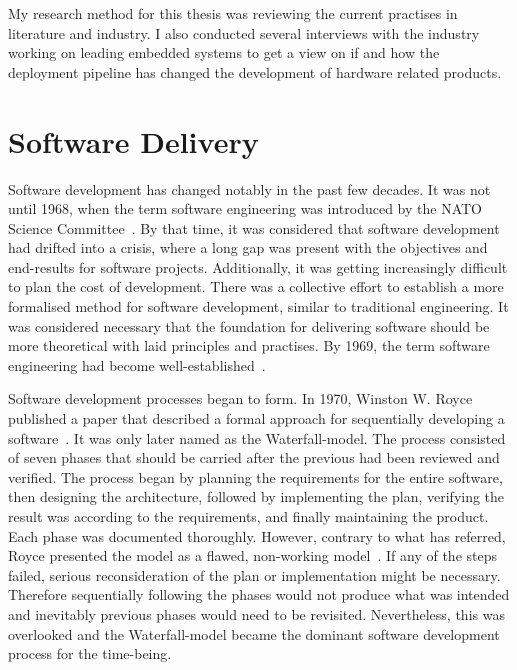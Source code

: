 \documentclass[english]{tktltiki2}
\begin{document}
My research method for this thesis was reviewing the current practises in literature and industry. I also conducted several interviews with the industry working on leading embedded systems to get a view on if and how the deployment pipeline has changed the development of hardware related products.


\section{Software Delivery}

Software development has changed notably in the past few decades. It was not until 1968, when the term software engineering was introduced by the NATO Science Committee~\cite{NR69}. By that time, it was considered that software development had drifted into a crisis, where a long gap was present with the objectives and end-results for software projects. Additionally, it was getting increasingly difficult to plan the cost of development. There was a collective effort to establish a more formalised method for software development, similar to traditional engineering. It was considered necessary that the foundation for delivering software should be more theoretical with laid principles and practises. By 1969, the term software engineering had become well-established~\cite{BR70}.

Software development processes began to form. In 1970, Winston W. Royce published a paper that described a formal approach for sequentially developing a software~\cite{Roy70}. It was only later named as the Waterfall-model. The process consisted of seven phases that should be carried after the previous had been reviewed and verified. The process began by planning the requirements for the entire software, then designing the architecture, followed by implementing the plan, verifying the result was according to the requirements, and finally maintaining the product. Each phase was documented thoroughly. However, contrary to what has referred, Royce presented the model as a flawed, non-working model~\cite{Roy70}. If any of the steps failed, serious reconsideration of the plan or implementation might be necessary. Therefore sequentially following the phases would not produce what was intended and inevitably previous phases would need to be revisited. Nevertheless, this was overlooked and the Waterfall-model became the dominant software development process for the time-being.
\end{document}
